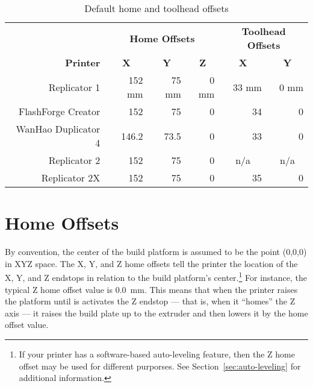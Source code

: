 {\begin{table}[!ht]
\centering
\begin{tabular}{r | r r r | r r}
\hline
&\multicolumn{3}{c|}{\textbf{Home Offsets}}&\multicolumn{2}{c}{\textbf{Toolhead Offsets}} \\
\textbf{Printer}&\multicolumn{1}{c}{\textbf{X}}&\multicolumn{1}{c}{\textbf{Y}}&\multicolumn{1}{c|}{\textbf{Z}}&\multicolumn{1}{c}{\textbf{X}}&\multicolumn{1}{c}{\textbf{Y}} \\
\hline
Replicator 1& 152 mm & 75 mm & 0 mm & 33 mm & 0 mm \\
FlashForge Creator& 152 \hphantom{mm} & 75 \hphantom{mm} & 0 \hphantom{mm} & 34 \hphantom{mm} & 0 \hphantom{mm}  \\
WanHao Duplicator 4& 146.2 \hphantom{mm} & 73.5 \hphantom{mm} & 0 \hphantom{mm} & 33 \hphantom{mm} & 0 \hphantom{mm} \\
Replicator 2& 152 \hphantom{mm} & 75 \hphantom{mm} & 0 \hphantom{mm} &\multicolumn{1}{c}{n/a} & \multicolumn{1}{c}{n/a} \\
Replicator 2X& 152 \hphantom{mm} & 75 \hphantom{mm} & 0 \hphantom{mm} & 35 \hphantom{mm} & 0 \hphantom{mm} \\ [0.5ex]
\hline
\end{tabular}
\caption[Default home and toolhead offsets]{Default home and toolhead offsets}
\label{tab:default-offsets}
\end{table}}


\section{Home Offsets} \label{sec:home-offsets}

By convention, the center of the build platform is assumed to be the point (0,0,0) in XYZ space.  The X, Y, and Z \glspl{home offset} tell the printer the location of the X, Y, and Z endstops in relation to the build platform's center.\footnote{If your printer has a software-based auto-leveling feature, then the Z home offset may be used for different purporses.  See Section~\ref{sec:auto-leveling} for additional information.}  For instance, the typical Z home offset value is 0.0~mm.  This means that when the printer raises the platform until is activates the Z endstop --- that is, when it ``homes'' the Z axis --- it raises the build plate up to the extruder and then lowers it by the home offset value.

